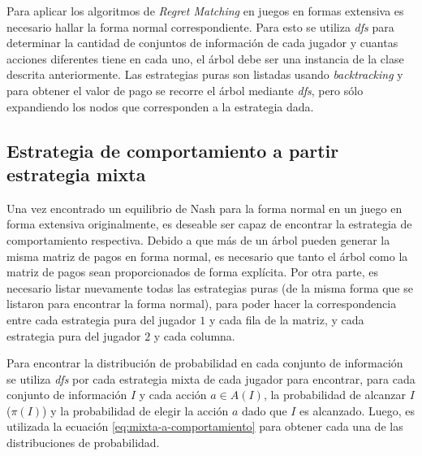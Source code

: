Para aplicar los algoritmos de \textit{Regret Matching} en juegos en formas extensiva es necesario hallar la forma normal correspondiente. Para esto se utiliza \textit{dfs} para determinar la cantidad de conjuntos de información de cada jugador y cuantas acciones diferentes tiene en cada uno, el árbol debe ser una instancia de la clase descrita anteriormente. Las estrategias puras son listadas usando \textit{backtracking} y para obtener el valor de pago se recorre el árbol mediante \textit{dfs}, pero sólo expandiendo los nodos que corresponden a la estrategia dada.

\subsection{Estrategia de comportamiento a partir estrategia mixta}
\label{subsec:EC-EM}
Una vez encontrado un equilibrio de Nash para la forma normal en un juego en forma extensiva originalmente, es deseable ser capaz de encontrar la estrategia de comportamiento respectiva. Debido a que más de un árbol pueden generar la misma matriz de pagos en forma normal, es necesario que tanto el árbol como la matriz de pagos sean proporcionados de forma explícita. Por otra parte, es necesario listar nuevamente todas las estrategias puras (de la misma forma que se listaron para encontrar la forma normal), para poder hacer la correspondencia entre cada estrategia pura del jugador $1$ y cada fila de la matriz, y cada estrategia pura del jugador $2$ y cada columna.

Para encontrar la distribución de probabilidad en cada conjunto de información se utiliza \textit{dfs} por cada estrategia mixta de cada jugador para encontrar, para cada conjunto de información $I$ y cada acción $a \in A(I)$, la probabilidad de alcanzar $I$ ($\pi(I)$) y la probabilidad de elegir la acción $a$ dado que $I$ es alcanzado. Luego, es utilizada la ecuación \ref{eq:mixta-a-comportamiento} para obtener cada una de las distribuciones de probabilidad.